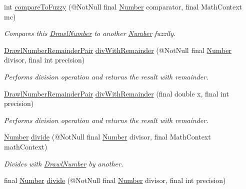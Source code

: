 \begin{DoxyCompactItemize}
int \hyperlink{classcom_1_1aarrelaakso_1_1drawl_1_1_drawl_number_a67bb221c313ba22d920db646d130d66f}{compare\+To\+Fuzzy} (@Not\+Null final \hyperlink{interfacecom_1_1aarrelaakso_1_1drawl_1_1_number}{Number} comparator, final Math\+Context mc)
\begin{DoxyCompactList}\small\item\em Compares this \hyperlink{classcom_1_1aarrelaakso_1_1drawl_1_1_drawl_number}{Drawl\+Number} to another \hyperlink{interfacecom_1_1aarrelaakso_1_1drawl_1_1_number}{Number} fuzzily. \end{DoxyCompactList}\item 
\hyperlink{classcom_1_1aarrelaakso_1_1drawl_1_1_drawl_number_remainder_pair}{Drawl\+Number\+Remainder\+Pair} \hyperlink{classcom_1_1aarrelaakso_1_1drawl_1_1_drawl_number_a452c8b23180fe298592093adde0fa87e}{div\+With\+Remainder} (@Not\+Null final \hyperlink{interfacecom_1_1aarrelaakso_1_1drawl_1_1_number}{Number} divisor, final int precision)
\begin{DoxyCompactList}\small\item\em Performs division operation and returns the result with remainder. \end{DoxyCompactList}\item 
\hyperlink{classcom_1_1aarrelaakso_1_1drawl_1_1_drawl_number_remainder_pair}{Drawl\+Number\+Remainder\+Pair} \hyperlink{classcom_1_1aarrelaakso_1_1drawl_1_1_drawl_number_a6dc7cefb2574b9675ab3bc099760cbd2}{div\+With\+Remainder} (final double x, final int precision)
\begin{DoxyCompactList}\small\item\em Performs division operation and returns the result with remainder. \end{DoxyCompactList}\item 
\hyperlink{interfacecom_1_1aarrelaakso_1_1drawl_1_1_number}{Number} \hyperlink{classcom_1_1aarrelaakso_1_1drawl_1_1_drawl_number_ad6350a9965757a1ffeb859d71ee0219e}{divide} (@Not\+Null final \hyperlink{interfacecom_1_1aarrelaakso_1_1drawl_1_1_number}{Number} divisor, final Math\+Context math\+Context)
\begin{DoxyCompactList}\small\item\em Divides with \hyperlink{classcom_1_1aarrelaakso_1_1drawl_1_1_drawl_number}{Drawl\+Number} by another. \end{DoxyCompactList}\item 
final \hyperlink{interfacecom_1_1aarrelaakso_1_1drawl_1_1_number}{Number} \hyperlink{classcom_1_1aarrelaakso_1_1drawl_1_1_drawl_number_a24ee9901f4d84a2fc086d4e727bf40c7}{divide} (@Not\+Null final \hyperlink{interfacecom_1_1aarrelaakso_1_1drawl_1_1_number}{Number} divisor, final int precision)

\end{DoxyCompactItemize}
